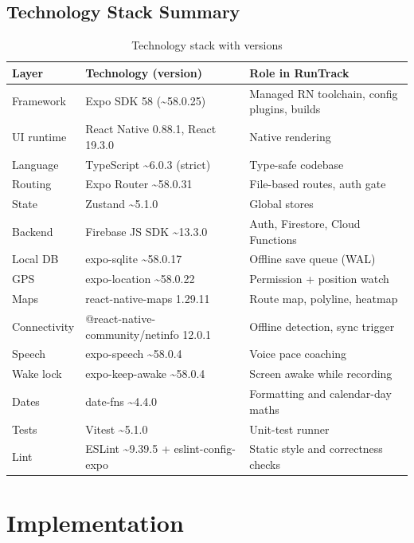 \documentclass[12pt, a4paper]{report}
\begin{document}
\section{Technology Stack Summary}
\begin{table}[H]
\centering
\caption{Technology stack with versions}
\label{tab:stack}
\small
\begin{tabularx}{\textwidth}{@{}l l L@{}}
\toprule
\textbf{Layer} & \textbf{Technology (version)} & \textbf{Role in RunTrack} \\
\midrule
Framework & Expo SDK 58 (\textasciitilde 58.0.25) & Managed RN toolchain,
  config plugins, builds \\
UI runtime & React Native 0.88.1, React 19.3.0 & Native rendering \\
Language & TypeScript \textasciitilde 6.0.3 (strict) & Type-safe codebase \\
Routing & Expo Router \textasciitilde 58.0.31 & File-based routes, auth gate \\
State & Zustand \textasciitilde 5.1.0 & Global stores \\
Backend & Firebase JS SDK \textasciitilde 13.3.0 & Auth, Firestore,
  Cloud Functions \\
Local DB & expo-sqlite \textasciitilde 58.0.17 & Offline save queue (WAL) \\
GPS & expo-location \textasciitilde 58.0.22 & Permission + position watch \\
Maps & react-native-maps 1.29.11 & Route map, polyline, heatmap \\
Connectivity & @react-native-community/netinfo 12.0.1 & Offline detection,
  sync trigger \\
Speech & expo-speech \textasciitilde 58.0.4 & Voice pace coaching \\
Wake lock & expo-keep-awake \textasciitilde 58.0.4 & Screen awake while
  recording \\
Dates & date-fns \textasciitilde 4.4.0 & Formatting and calendar-day maths \\
Tests & Vitest \textasciitilde 5.1.0 & Unit-test runner \\
Lint & ESLint \textasciitilde 9.39.5 + eslint-config-expo & Static style and
  correctness checks \\
\bottomrule
\end{tabularx}
\end{table}

\chapter{Implementation}
\end{document}
